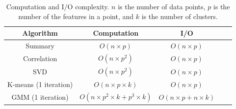 %
\begin{table}
\begin{center}
\footnotesize
\begin{tabular}{|c|c|c|c|c|}
\hline
Algorithm & Computation & I/O \\
\hline
Summary & $O(n \times p)$ & $O(n \times p)$ \\
\hline
Correlation & $O(n \times p^2)$ & $O(n \times p)$ \\
\hline
SVD & $O(n \times p^2)$ & $O(n \times p)$ \\
\hline
K-means (1 iteration) & $O(n \times p \times k)$ & $O(n \times p)$ \\
\hline
GMM (1 iteration) & $O(n \times p^2 \times k + p^3 \times k)$ & $O(n \times p + n \times k)$ \\
\hline
\end{tabular}
\normalsize
\end{center}
\vspace{-10pt}
\caption{Computation and I/O complexity. 
$n$ is the number of data points, $p$ 
is the number of the features in a point, and $k$ is the number of
clusters. }
\label{tbl:algs}
\end{table}


